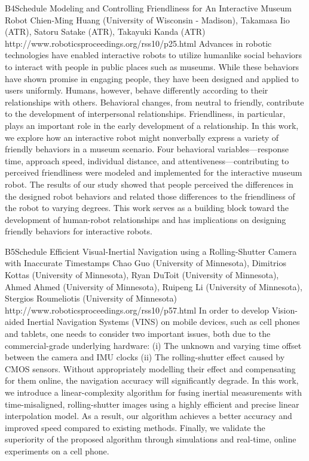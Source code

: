 \begin{spacing}{1.0}
\descriptionPaper
{B4}{Schedule}
{
Modeling and Controlling Friendliness for An Interactive Museum Robot
}
{
Chien-Ming Huang (University of Wisconsin - Madison), Takamasa Iio (ATR), Satoru Satake (ATR), Takayuki Kanda (ATR)
}
{
http://www.roboticsproceedings.org/rss10/p25.html
}
{
Advances in robotic technologies have enabled interactive robots to utilize humanlike social behaviors to interact with people in public places such as museums. While these behaviors have shown promise in engaging people, they have been designed and applied to users uniformly. Humans, however, behave differently according to their relationships with others. Behavioral changes, from neutral to friendly, contribute to the development of interpersonal relationships. Friendliness, in particular, plays an important role in the early development of a relationship. In this work, we explore how an interactive robot might nonverbally express a variety of friendly behaviors in a museum scenario. Four behavioral variables—response time, approach speed, individual distance, and attentiveness—contributing to perceived friendliness were modeled and implemented for the interactive museum robot. The results of our study showed that people perceived the differences in the designed robot behaviors and related those differences to the friendliness of the robot to varying degrees. This work serves as a building block toward the development of human-robot relationships and has implications on designing friendly behaviors for interactive robots.
}


\descriptionPaper
{B5}{Schedule}
{
Efficient Visual-Inertial Navigation using a Rolling-Shutter Camera with Inaccurate Timestamps
}
{
Chao Guo (University of Minnesota), Dimitrios Kottas (University of Minnesota), Ryan DuToit (University of Minnesota), Ahmed Ahmed (University of Minnesota), Ruipeng Li (University of Minnesota), Stergios Roumeliotis (University of Minnesota)
}
{
http://www.roboticsproceedings.org/rss10/p57.html
}
{
In order to develop Vision-aided Inertial Navigation Systems (VINS) on mobile devices, such as cell phones and tablets, one needs to consider two important issues, both due to the commercial-grade underlying hardware: (i) The unknown and varying time offset between the camera and IMU clocks (ii) The rolling-shutter effect caused by CMOS sensors. Without appropriately modelling their effect and compensating for them online, the navigation accuracy will significantly degrade. In this work, we introduce a linear-complexity algorithm for fusing inertial measurements with time-misaligned, rolling-shutter images using a highly efficient and precise linear interpolation model. As a result, our algorithm achieves a better accuracy and improved speed compared to existing methods. Finally, we validate the superiority of the proposed algorithm through simulations and real-time, online experiments on a cell phone.
}



\end{spacing}
